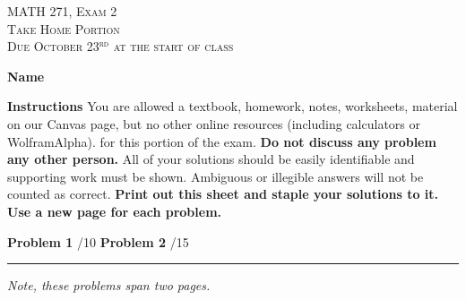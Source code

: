 \documentclass[12pt]{amsbook}
\begin{document}

\begin{center}
   \textsc{\large MATH 271, Exam 2}\\
   \textsc{Take Home Portion}\\
   \textsc{Due October 23$^\textrm{rd}$ at the start of class}
\end{center}
\vspace{1cm}

\noindent\textbf{Name} \; \underline{\hspace{8cm}}

\vspace{1cm}

\noindent\textbf{Instructions} \; You are allowed a textbook, homework, notes, worksheets, material on our Canvas page, but no other online resources (including calculators or WolframAlpha). for this portion of the exam.  \textbf{Do not discuss any problem any other person.} All of your solutions should be easily identifiable and supporting work must be shown.  Ambiguous or illegible answers will not be counted as correct. \textbf{Print out this sheet and staple your solutions to it. Use a new page for each problem.}


\vspace{1cm}

\begin{center}\textbf{Problem 1} \; \underline{\hspace{1cm}}/10 \qquad \qquad \textbf{Problem 2} \; \underline{\hspace{1cm}}/15\end{center}

\vspace{1cm}

\hrule

\vspace*{1cm}
\noindent\emph{Note, these problems span two pages.}
\end{document}
